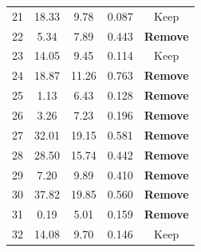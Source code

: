 \begin{center}
\begin{longtable}{@{}ccccc@{}}
21 & 18.33 & 9.78 & 0.087 & Keep\\
22 & 5.34 & 7.89 & 0.443 & \textcolor{accent}{\textbf{Remove}}\\
23 & 14.05 & 9.45 & 0.114 & Keep\\
24 & 18.87 & 11.26 & 0.763 & \textcolor{accent}{\textbf{Remove}}\\
25 & 1.13 & 6.43 & 0.128 & \textcolor{accent}{\textbf{Remove}}\\
26 & 3.26 & 7.23 & 0.196 & \textcolor{accent}{\textbf{Remove}}\\
27 & 32.01 & 19.15 & 0.581 & \textcolor{accent}{\textbf{Remove}}\\
28 & 28.50 & 15.74 & 0.442 & \textcolor{accent}{\textbf{Remove}}\\
29 & 7.20 & 9.89 & 0.410 & \textcolor{accent}{\textbf{Remove}}\\
30 & 37.82 & 19.85 & 0.560 & \textcolor{accent}{\textbf{Remove}}\\
31 & 0.19 & 5.01 & 0.159 & \textcolor{accent}{\textbf{Remove}}\\
32 & 14.08 & 9.70 & 0.146 & Keep\\
\bottomrule
\end{longtable}
\end{center}

\clearpage
